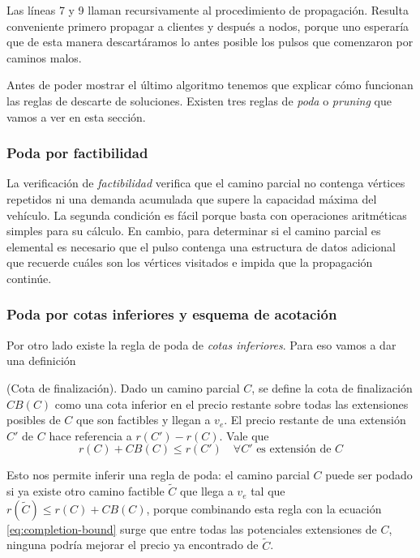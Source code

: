 Las líneas 7 y 9 llaman recursivamente al procedimiento de propagación. Resulta conveniente primero propagar a clientes y después a nodos, porque uno esperaría que de esta manera descartáramos lo antes posible los pulsos que comenzaron por caminos malos. 

Antes de poder mostrar el último algoritmo tenemos que explicar cómo funcionan las reglas de descarte de soluciones. Existen tres reglas de \emph{poda} o \emph{pruning} que vamos a ver en esta sección.

\subsubsection{Poda por factibilidad}

La verificación de \emph{factibilidad} verifica que el camino parcial no contenga vértices repetidos ni una demanda acumulada que supere la capacidad máxima del vehículo. La segunda condición es fácil porque basta con operaciones aritméticas simples para su cálculo. En cambio, para determinar si el camino parcial es elemental es necesario que el pulso contenga una estructura de datos adicional que recuerde cuáles son los vértices visitados e impida que la propagación continúe.

\subsubsection{Poda por cotas inferiores y esquema de acotación}
\label{subsubsection:pulse-lower-bound}

Por otro lado existe la regla de poda de \emph{cotas inferiores}. Para eso vamos a dar una definición

\begin{definition}
    (Cota de finalización).
    Dado un camino parcial $C$, se define la cota de finalización $CB(C)$ como una cota inferior en el precio restante sobre todas las extensiones posibles de $C$  que son factibles y llegan a $v_e$. El precio restante de una extensión $C'$ de $C$ hace referencia a $r(C') - r(C)$. Vale que
    \begin{equation}
    \label{eq:completion-bound}
        r(C) + CB(C) \leq r(C') \quad \forall C' \text{ es extensión de } C
    \end{equation}
\end{definition}

Esto nos permite inferir una regla de poda: el camino parcial $C$ puede ser podado si ya existe otro camino factible $\tilde{C}$ que llega a $v_e$ tal que $r(\tilde{C}) \leq r(C) + CB(C)$, porque combinando esta regla con la ecuación \ref{eq:completion-bound} surge que entre todas las potenciales extensiones de $C$, ninguna podría mejorar el precio ya encontrado de $\tilde{C}$.

